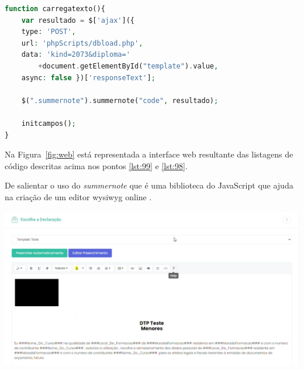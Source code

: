 \begin{lstlisting}[language={php},
                   caption={Função JavaScript utilizando jQuery.ajax()},
                   label=lst:98]
function carregatexto(){
    var resultado = $['ajax']({
    type: 'POST',
    url: 'phpScripts/dbload.php',
    data: 'kind=2073&diploma='
        +document.getElementById("template").value,
    async: false })['responseText'];

	$(".summernote").summernote("code", resultado);

	initcampos();
}
\end{lstlisting}


Na Figura~\ref{fig:web} está representada a interface web resultante das listagens de código descritas acima nos pontos \ref{lst:99} e \ref{lst:98}.

De salientar o uso do \textit{summernote} que é uma biblioteca do JavaScript que ajuda na criação de um editor \acrshort{wysiwyg} online \citep{summernote}.


\begin{center}
        \includegraphics[width=\textwidth,height=\textheight,keepaspectratio]{images/frontend.png}
        \label{fig:web}
\end{center}

